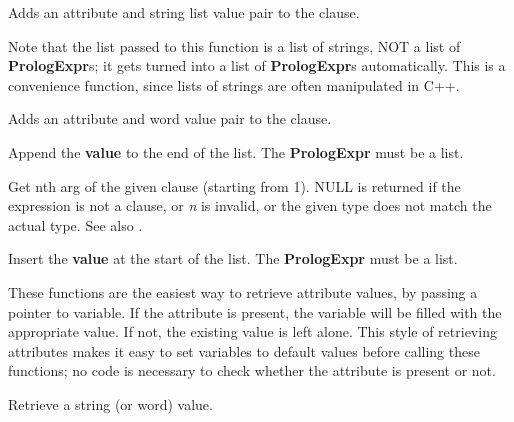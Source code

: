 
Adds an attribute and string list value pair to the clause.

Note that the list passed to this function is a list of strings, NOT a list
of {\bf PrologExpr}s; it gets turned into a list of {\bf PrologExpr}s
automatically. This is a convenience function, since lists of strings
are often manipulated in C++.



Adds an attribute and word value pair to the clause.



Append the {\bf value} to the end of the list. The {\bf PrologExpr}\rtfsp
must be a list.

\label{arg}


Get nth arg of the given clause (starting from 1). NULL is returned if
the expression is not a clause, or {\it n} is invalid, or the given type
does not match the actual type. See also .



Insert the {\bf value} at the start of the list. The {\bf PrologExpr}\rtfsp 
must be a list.


These functions are the easiest way to retrieve attribute values, by
passing a pointer to variable. If the attribute is present, the
variable will be filled with the appropriate value.  If not, the
existing value is left alone.  This style of retrieving attributes
makes it easy to set variables to default values before calling these
functions; no code is necessary to check whether the attribute is
present or not.


Retrieve a string (or word) value.

